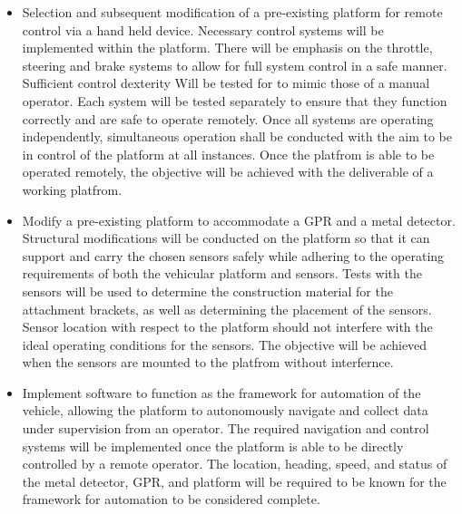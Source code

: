 \documentclass[main.tex]{subfiles}
\begin{document}
\begin{itemize}
\item Selection and subsequent modification of a pre-existing platform for remote control via a hand held device. Necessary control systems will be implemented within the platform. There will be emphasis on the throttle, steering and brake systems to allow for full system control in a safe manner. Sufficient control dexterity Will be tested for to mimic those of a manual operator. Each system will be tested separately to ensure that they function correctly and are safe to operate remotely. Once all systems are operating independently, simultaneous operation shall be conducted with the aim to be in control of the platform at all instances. Once the platfrom is able to be operated remotely, the objective will be achieved with the deliverable of a working platfrom.%

\item Modify a pre-existing platform to accommodate a GPR and a metal detector. Structural modifications will be conducted on the platform so that it can support and carry the chosen sensors safely while adhering to the operating requirements of both the vehicular platform and sensors. %
Tests with the sensors will be used to determine the construction material for the attachment brackets, as well as determining the placement of the sensors. Sensor location with respect to the platform should not interfere with the ideal operating conditions for the sensors. The objective will be achieved when the sensors are mounted to the platfrom without interfernce.

\item Implement software to function as the framework for automation of the vehicle, allowing the platform to autonomously navigate and collect data under supervision from an operator. 
The required navigation and control systems will be implemented once the platform is able to be directly controlled by a remote operator. The location, heading, speed, and status of the metal detector, GPR, and platform will be required to be known for the framework for automation to be considered complete.



\end{itemize}
\end{document}
